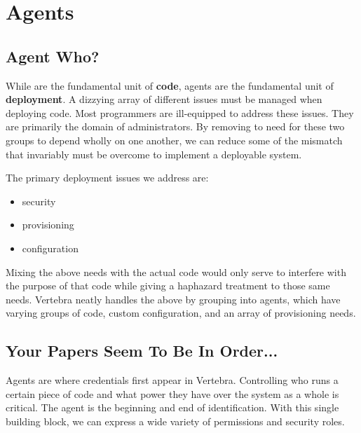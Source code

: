 \newcommand{\agent}{{\sf agent}}
\newcommand{\agents}{{\sf agents}}
\newcommand{\Agent}{{\sf Agent}}
\newcommand{\Agents}{{\sf Agents}}

\section{Agents}

\subsection{Agent Who?}

While \actors{} are the fundamental unit of \textbf{code}, \agents{} are the fundamental unit of \textbf{deployment}.  A dizzying array of different issues must be managed when deploying code.  Most programmers are ill-equipped to address these issues.  They are primarily the domain of administrators.  By removing to need for these two groups to depend wholly on one another, we can reduce some of the mismatch that invariably must be overcome to implement a deployable system.

The primary deployment issues we address are:

\begin{itemize}
	\item security
	\item provisioning
	\item configuration
\end{itemize}

Mixing the above needs with the actual code would only serve to interfere with the purpose of that code while giving a haphazard treatment to those same needs.  Vertebra neatly handles the above by grouping \actors{} into \agents{}, which have varying groups of \actor{} code, custom configuration, and an array of provisioning needs.

\subsection{Your Papers Seem To Be In Order...}

\Agents{} are where credentials first appear in Vertebra.  Controlling who runs a certain piece of code and what power they have over the system as a whole is critical.  The \agent{} is the beginning and end of identification.  With this single building block, we can express a wide variety of permissions and security roles.


